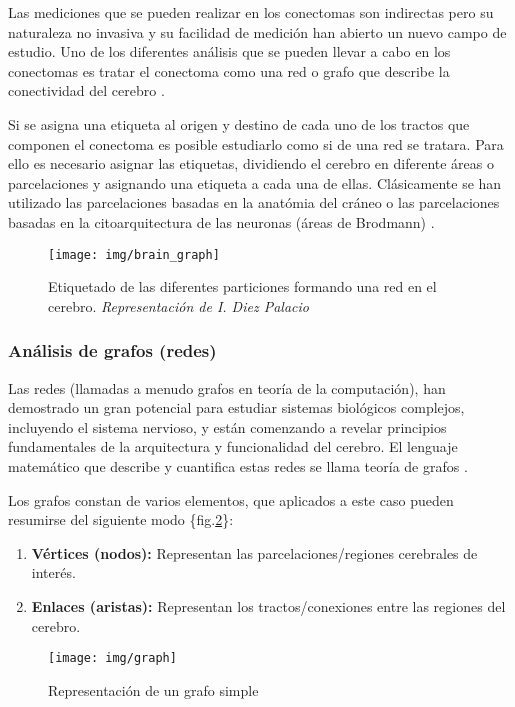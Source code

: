\documentclass[fleqn,12pt]{uicarticle} %
\begin{document}
Las mediciones que se pueden realizar en los conectomas son indirectas pero su naturaleza no invasiva y su facilidad de medición han abierto un nuevo campo de estudio. Uno de los diferentes análisis que se pueden llevar a cabo en los conectomas es tratar el conectoma como una red o grafo que describe la conectividad del cerebro \cite{Fornito, Bullmore2009}.

Si se asigna una etiqueta al origen y destino de cada uno de los tractos que componen el conectoma es posible estudiarlo como si de una red se tratara. Para ello es necesario asignar las etiquetas, dividiendo el cerebro  en diferente áreas o parcelaciones y asignando una etiqueta a cada una de ellas. Clásicamente se han utilizado las parcelaciones basadas en la anatómia del cráneo o las parcelaciones basadas en la citoarquitectura de las neuronas (áreas de Brodmann) \cite{Destrieux2010}.

\begin{figure}[h]
	\centering
	\texttt{[image: img/brain\_graph]}
	\caption{Etiquetado de las diferentes particiones formando una red en el cerebro. \textit{Representación de I. Diez Palacio}}
	\label{fig:brein_graph}
\end{figure}

\subsubsection{Análisis de grafos (redes)}

Las redes (llamadas a menudo grafos en teoría de la computación), han demostrado un gran potencial para estudiar sistemas biológicos complejos, incluyendo el sistema nervioso, y están comenzando a revelar principios fundamentales de la arquitectura y funcionalidad del cerebro. El lenguaje matemático que describe y cuantifica estas redes se llama teoría de grafos \cite{Mori2002}. 
 
Los grafos constan de varios elementos, que aplicados a este caso pueden resumirse del siguiente modo  \{fig.\ref{fig:graph}\}:
\begin{enumerate}[noitemsep]
\item \textbf{Vértices (nodos):} Representan las parcelaciones/regiones cerebrales de interés.
\item \textbf{Enlaces (aristas):} Representan los tractos/conexiones entre las regiones del cerebro.
\end{enumerate}

\begin{figure}[h]
	\centering
	\texttt{[image: img/graph]}
	\vspace{5mm} 
	\caption{Representación de un grafo simple}
	\label{fig:graph}
\end{figure}
\end{document}
